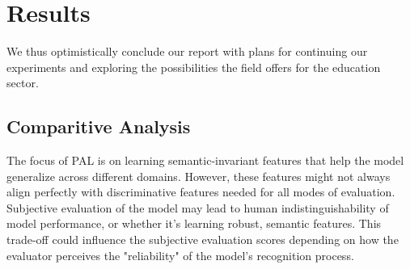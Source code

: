 \documentclass[9pt,a4paper,twoside]{rho-class/rho}
\begin{document}
\section{Results}
We thus optimistically conclude our report with plans for continuing our experiments and exploring the possibilities the field offers for the education sector.

\subsection{Comparitive Analysis}
The focus of PAL is on learning semantic-invariant features that help the model generalize across different domains. However, these features might not always align perfectly with discriminative features needed for all modes of evaluation.
Subjective evaluation of the model may lead to human indistinguishability of model performance, or whether it's learning robust, semantic features. This trade-off could influence the subjective evaluation scores depending on how the evaluator perceives the "reliability" of the model’s recognition process.
\end{document}
